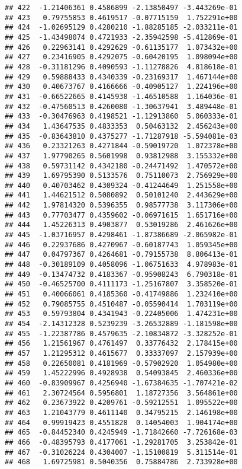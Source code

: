 \documentclass[
]{article}
\begin{document}
\begin{verbatim}
## 422  -1.21406361 0.4586899 -2.13850497 -3.443269e-01
## 423   0.79755853 0.4619517 -0.07715159  1.752291e+00
## 424  -1.02695129 0.4280210 -1.88285185 -2.033211e-01
## 425  -1.43498074 0.4721933 -2.35942598 -5.412869e-01
## 426   0.22963141 0.4292629 -0.61135177  1.073432e+00
## 427   0.23416905 0.4292075 -0.60420195  1.098094e+00
## 428  -0.31181296 0.4090593 -1.11278826  4.818618e-01
## 429   0.59888433 0.4340339 -0.23169317  1.467144e+00
## 430   0.40673767 0.4166666 -0.40905127  1.224196e+00
## 431  -0.66522665 0.4145938 -1.46510588  1.164036e-01
## 432  -0.47560513 0.4260080 -1.30637941  3.489448e-01
## 433  -0.30476963 0.4198521 -1.12913860  5.060333e-01
## 434   1.43647535 0.4833353  0.50463132  2.456243e+00
## 435  -0.83643810 0.4375277 -1.71287918 -5.594081e-03
## 436   0.23321263 0.4271844 -0.59019720  1.072378e+00
## 437   1.97790265 0.5601998  0.93812988  3.155332e+00
## 438   0.59731142 0.4342180 -0.24471492  1.470572e+00
## 439   1.69795390 0.5133576  0.75110073  2.756929e+00
## 440   0.40703462 0.4309324 -0.41244649  1.251558e+00
## 441   1.44621512 0.5080892  0.50101240  2.443629e+00
## 442   1.97814320 0.5396355  0.98577738  3.117306e+00
## 443   0.77703477 0.4359602 -0.06971615  1.651716e+00
## 444   1.45226313 0.4903877  0.53019286  2.461626e+00
## 445  -1.03716957 0.4298461 -1.87386689 -2.065982e-01
## 446   0.22937686 0.4270967 -0.60187743  1.059345e+00
## 447   0.04797367 0.4264681 -0.79155738  8.806413e-01
## 448  -0.30189109 0.4058096 -1.06751633  4.978983e-01
## 449  -0.13474732 0.4183367 -0.95908243  6.790318e-01
## 450  -0.46525700 0.4111173 -1.25167807  3.358520e-01
## 451   0.40066061 0.4185360 -0.41749886  1.232410e+00
## 452   0.79085755 0.4510487 -0.05590414  1.703119e+00
## 453   0.59793804 0.4341943 -0.22405006  1.474231e+00
## 454  -2.14312328 0.5239239 -3.26532889 -1.181598e+00
## 455  -1.22387786 0.4579635 -2.10834872 -3.328252e-01
## 456   1.21561967 0.4761497  0.33776432  2.178415e+00
## 457   1.21295312 0.4615677  0.33337097  2.157939e+00
## 458   0.22650081 0.4181969 -0.57902920  1.054980e+00
## 459   1.45222996 0.4928938  0.54093845  2.460336e+00
## 460  -0.83909967 0.4256940 -1.67384635 -1.707421e-02
## 461   2.30724564 0.5956801  1.18727356  3.564861e+00
## 462   0.23673922 0.4209761 -0.59212551  1.095522e+00
## 463   1.21043779 0.4611140  0.34795215  2.146198e+00
## 464   0.99919423 0.4551828  0.14054003  1.904174e+00
## 465  -0.84452340 0.4245949 -1.71842660 -7.726168e-03
## 466  -0.48395793 0.4177061 -1.29281705  3.253842e-01
## 467  -0.31026224 0.4304007 -1.15100819  5.311514e-01
## 468   1.69725981 0.5040356  0.75884786  2.733928e+00

\end{verbatim}
\end{document}
